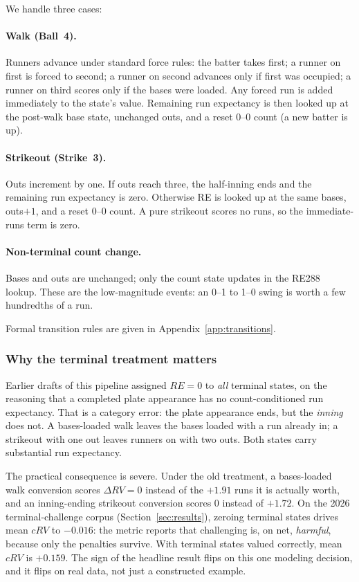 We handle three cases:

\paragraph{Walk (Ball~4).} Runners advance under standard force rules: the
batter takes first; a runner on first is forced to second; a runner on second
advances only if first was occupied; a runner on third scores only if the bases
were loaded. Any forced run is added immediately to the state's value. Remaining
run expectancy is then looked up at the post-walk base state, unchanged outs,
and a reset $0$--$0$ count (a new batter is up).

\paragraph{Strikeout (Strike~3).} Outs increment by one. If outs reach three,
the half-inning ends and the remaining run expectancy is zero. Otherwise RE is
looked up at the same bases, outs$+1$, and a reset $0$--$0$ count. A pure
strikeout scores no runs, so the immediate-runs term is zero.

\paragraph{Non-terminal count change.} Bases and outs are unchanged; only the
count state updates in the RE288 lookup. These are the low-magnitude events: an
0--1 to 1--0 swing is worth a few hundredths of a run.

Formal transition rules are given in Appendix~\ref{app:transitions}.

\subsubsection{Why the terminal treatment matters}
Earlier drafts of this pipeline assigned $RE = 0$ to \emph{all} terminal
states, on the reasoning that a completed plate appearance has no
count-conditioned run expectancy. That is a category error: the plate
appearance ends, but the \emph{inning} does not. A bases-loaded walk leaves
the bases loaded with a run already in; a strikeout with one out leaves runners
on with two outs. Both states carry substantial run expectancy.

The practical consequence is severe. Under the old treatment, a bases-loaded
walk conversion scores $\Delta RV = 0$ instead of the $+1.91$ runs it is
actually worth, and an inning-ending strikeout conversion scores $0$ instead of
$+1.72$. On the 2026 terminal-challenge corpus (Section~\ref{sec:results}), zeroing terminal
states drives mean $cRV$ to $-0.016$: the metric reports that challenging is,
on net, \emph{harmful}, because only the penalties survive. With terminal states
valued correctly, mean $cRV$ is $+0.159$. The sign of the headline result flips
on this one modeling decision, and it flips on real data, not just a
constructed example.

